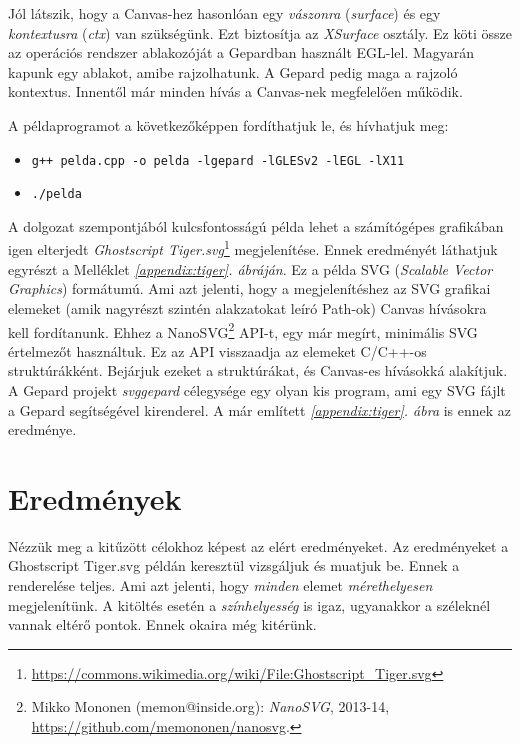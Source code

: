 \documentclass[12pt]{report}
\theoremstyle{definition}
\newcommand{\inenglish}[1]{\textsl{#1}}
\newcommand{\func}[1]{{\textsl{#1}}}
\begin{document}
Jól látszik, hogy a Canvas-hez hasonlóan egy \emph{vászonra} (\func{surface})
és egy \emph{kontextusra} (\func{ctx}) van szükségünk. Ezt biztosítja az
\func{XSurface} osztály. Ez köti össze az operációs rendszer ablakozóját a
Gepardban használt EGL-lel. Magyarán kapunk egy ablakot, amibe rajzolhatunk. A
Gepard pedig maga a rajzoló kontextus. Innentől már minden hívás a Canvas-nek
megfelelően működik.

A példaprogramot a következőképpen fordíthatjuk le, és hívhatjuk meg:
  {\small
    \begin{itemize} \renewcommand\labelitemi{\texttt{\$}}
      \item \texttt{g++ pelda.cpp -o pelda -lgepard -lGLESv2 -lEGL -lX11}
      \item \texttt{./pelda}
    \end{itemize}
  }

A dolgozat szempontjából kulcsfontosságú példa lehet a számítógépes grafikában
igen elterjedt \func{Ghostscript Tiger.svg}\footnote{ {\footnotesize
\url{https://commons.wikimedia.org/wiki/File:Ghostscript_Tiger.svg}}}
megjelenítése. Ennek eredményét láthatjuk egyrészt a Melléklet
\emph{\ref{appendix:tiger}. ábráján}. Ez a példa SVG (\inenglish{Scalable
Vector Graphics}) formátumú. Ami azt jelenti, hogy a megjelenítéshez az SVG
grafikai elemeket (amik nagyrészt szintén alakzatokat leíró Path-ok) Canvas
hívásokra kell fordítanunk. Ehhez a NanoSVG\footnote{Mikko Mononen
(memon@inside.org): \emph{NanoSVG}, 2013-14, \\
{\footnotesize\url{https://github.com/memononen/nanosvg}}.} API-t, egy már
megírt, minimális SVG értelmezőt használtuk. Ez az API visszaadja az elemeket
C/C++-os struktúrákként. Bejárjuk ezeket a struktúrákat, és Canvas-es hívásokká
alakítjuk. A Gepard projekt \func{svggepard} célegysége egy olyan kis program,
ami egy SVG fájlt a Gepard segítségével kirenderel. A már említett
\emph{\ref{appendix:tiger}. ábra} is ennek az eredménye.

    \section{Eredmények}
    \label{sec:Eredmények}

Nézzük meg a kitűzött célokhoz képest az elért eredményeket. Az eredményeket a
Ghostscript Tiger.svg példán keresztül vizsgáljuk és muatjuk be. Ennek a
renderelése teljes. Ami azt jelenti, hogy \emph{minden} elemet
\emph{mérethelyesen} megjelenítünk. A kitöltés esetén a \emph{színhelyesség} is
igaz, ugyanakkor a széleknél vannak eltérő pontok. Ennek okaira még kitérünk.
\end{document}
